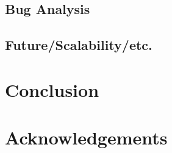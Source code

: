 \documentclass[letterpaper,12pt]{article}
\begin{document}
\subsection{Bug Analysis}

\subsection{Future/Scalability/etc.}

\section{Conclusion}

\section{Acknowledgements}


{\footnotesize 
}


\end{document}
